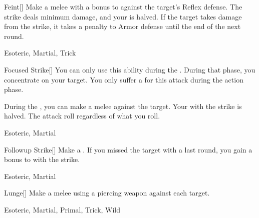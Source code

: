 \lowercase{\hypertarget{maneuver:Feint}{}}\label{maneuver:Feint}
\hypertarget{maneuver:Feint}{}
\begin{freeability}[Rank 2]{Feint}[]
Make a melee  with a  bonus to  against the target's Reflex defense.
The strike deals minimum damage, and your  is halved.
If the target takes damage from the strike, it takes a  penalty to Armor defense until the end of the next round.


 Esoteric, Martial, Trick
\end{freeability}
\vspace{0.25em}



\lowercase{\hypertarget{maneuver:Focused Strike}{}}\label{maneuver:Focused Strike}
\hypertarget{maneuver:Focused Strike}{}
\begin{freeability}[Rank 2]{Focused Strike}[]
You can only use this ability during the .
During that phase, you concentrate on your target.
You only suffer a  for this attack during the action phase.

During the , you can make a melee  against the target.
Your  with the strike is halved.
The attack roll  regardless of what you roll.


 Esoteric, Martial
\end{freeability}
\vspace{0.25em}



\lowercase{\hypertarget{maneuver:Followup Strike}{}}\label{maneuver:Followup Strike}
\hypertarget{maneuver:Followup Strike}{}
\begin{freeability}[Rank 2]{Followup Strike}[]
Make a .
If you missed the target with a  last round, you gain a  bonus to  with the strike.


 Esoteric, Martial
\end{freeability}
\vspace{0.25em}



\lowercase{\hypertarget{maneuver:Lunge}{}}\label{maneuver:Lunge}
\hypertarget{maneuver:Lunge}{}
\begin{freeability}[Rank 2]{Lunge}[]
Make a melee  using a piercing weapon against each target.


 Esoteric, Martial, Primal, Trick, Wild
\end{freeability}
\vspace{0.25em}



